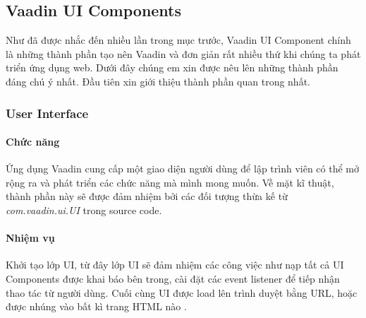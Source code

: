 
\subsection{Vaadin UI Components}
Như đã được nhắc đến nhiều lần trong mục trước, Vaadin UI Component chính là những thành phần tạo nên Vaadin và đơn giản rất nhiều thứ khi chúng ta phát triển ứng dụng web. Dưới đây chúng em xin được nêu lên những thành phần đáng chú ý nhất. Đầu tiên xin giới thiệu thành phần quan trong nhất.

\subsubsection{User Interface} 
\paragraph{Chức năng} Ứng dụng Vaadin cung cấp một giao diện người dùng để lập trình viên có thể mở rộng ra và phát triển các chức năng mà mình mong muốn. Về mặt kĩ thuật, thành phần này sẽ được đảm nhiệm bởi các đối tượng thừa kế từ \textit{com.vaadin.ui.UI} trong source code.
\paragraph{Nhiệm vụ} Khởi tạo lớp UI, từ đây lớp UI sẽ đảm nhiệm các công việc như nạp tất cả UI Components được khai báo bên trong, cài đặt các event listener để tiếp nhận thao tác từ người dùng. Cuối cùng UI được load lên trình duyệt bằng URL, hoặc được nhúng 
vào bất kì trang HTML nào \cite{vaadinarchitecture}.


